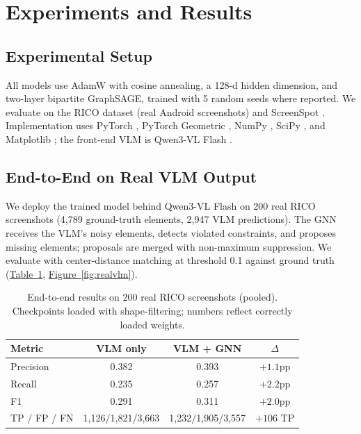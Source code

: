 \documentclass[11pt, letterpaper]{article}
\begin{document}
\section{Experiments and Results}
\subsection{Experimental Setup}
All models use AdamW with cosine annealing, a 128-d hidden dimension, and
two-layer bipartite GraphSAGE, trained with 5 random seeds where reported.
We evaluate on the RICO dataset \cite{dek.a17rico} (real Android screenshots)
and ScreenSpot \cite{cheng2024seclick}. Implementation uses
PyTorch \cite{paszke2019pytorch}, PyTorch Geometric \cite{fey2019pyg},
NumPy \cite{harris2020numpy}, SciPy \cite{virtanen2020scipy}, and
Matplotlib \cite{hunter2007matplotlib}; the front-end VLM is
Qwen3-VL Flash \cite{bai2023qwen}.

\subsection{End-to-End on Real VLM Output}\label{sec:endtoend}
We deploy the trained model behind Qwen3-VL Flash on 200 real RICO
screenshots (4{,}789 ground-truth elements, 2{,}947 VLM predictions). The GNN
receives the VLM's noisy elements, detects violated constraints, and proposes
missing elements; proposals are merged with non-maximum suppression. We
evaluate with center-distance matching at threshold 0.1 against ground truth
(\hyperref[tab:real]{Table~\ref{tab:real}}, \hyperref[fig:realvlm]{Figure~\ref{fig:realvlm}}).

\begin{table}[htbp]
\caption{End-to-end results on 200 real RICO screenshots (pooled).
Checkpoints loaded with shape-filtering; numbers reflect correctly loaded
weights.}
\label{tab:real}
\centering
\begin{tabularx}{\textwidth}{Xccc}
\toprule
\textbf{Metric} & \textbf{VLM only} & \textbf{VLM + GNN} & \textbf{$\Delta$} \\
\midrule
Precision & 0.382 & 0.393 & $+1.1$pp \\
Recall & 0.235 & 0.257 & $+2.2$pp \\
F1 & 0.291 & 0.311 & $+2.0$pp \\
TP / FP / FN & 1{,}126/1{,}821/3{,}663 & 1{,}232/1{,}905/3{,}557 & $+106$ TP \\
\bottomrule
\end{tabularx}
\end{table}
\end{document}
